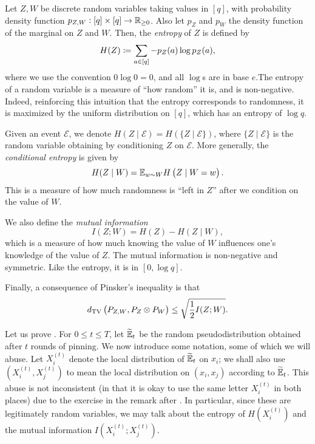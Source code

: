 \documentclass{article}
\begin{document}
\begin{tcolorbox}[title={A Crash Course on Information Theory}]
	Let $Z,W$ be discrete random variables taking values in $[q]$, with probability density function $p_{Z,W} : [q] \times [q] \to \mathbb{R}_{\ge 0}$. Also let $p_{Z}$ and $p_{W}$ the density function of the marginal on $Z$ and $W$. Then, the \emph{entropy} of $Z$ is defined by
	\[ H(Z) \coloneqq \sum_{a \in [q]} - p_Z(a) \log p_Z(a), \]
	where we use the convention $0 \log 0 = 0$, and all $\log$s are in base $e$.The entropy of a random variable is a measure of ``how random'' it is, and is non-negative. Indeed, reinforcing this intuition that the entropy corresponds to randomness, it is maximized by the uniform distribution on $[q]$, which has an entropy of $\log q$. 

	Given an event $\mathcal{E}$, we denote $H(Z \mid \mathcal{E}) = H(\{Z \mid \mathcal{E}\})$, where $\{Z \mid \mathcal{E}\}$ is the random variable obtaining by conditioning $Z$ on $\mathcal{E}$. More generally, the \emph{conditional entropy} is given by
	\[ H(Z\mid W) = \mathbb{E}_{w \sim W} H\left( Z \mid W = w \right). \]
	This is a measure of how much randomness is ``left in $Z$'' after we condition on the value of $W$.

	We also define the \emph{mutual information}
	\[ I(Z;W) = H(Z) - H(Z \mid W), \]
	which is a measure of how much knowing the value of $W$ influences one's knowledge of the value of $Z$. The mutual information is non-negative and symmetric. Like the entropy, it is in $[0, \log q]$.

	Finally, a consequence of Pinsker's inequality is that
	\begin{equation}
		\label{eq:pinsker-ineq}
		d_{\mathrm{TV}}\left(P_{Z,W},P_{Z} \otimes P_W\right) \le \sqrt{ \frac{1}{2} I(Z;W) }.
	\end{equation}
\end{tcolorbox}

Let us prove . For $0 \le t \le T$, let $\widetilde{\mathbb{E}}_t$ be the random pseudodistribution obtained after $t$ rounds of pinning. We now introduce some notation, some of which we will abuse. Let $X_i^{(t)}$ denote the local distribution of $\widetilde{\mathbb{E}}_t$ on $x_i$; we shall also use $(X_i^{(t)},X_j^{(t)})$ to mean the local distribution on $(x_i,x_j)$ according to $\widetilde{\mathbb{E}}_t$. This abuse is not inconsistent (in that it is okay to use the same letter $X_i^{(t)}$ in both places) due to the exercise in the remark after . In particular, since these are legitimately random variables, we may talk about the entropy of $H(X_i^{(t)})$ and the mutual information $I(X_i^{(t)};X_j^{(t)})$.
\end{document}
